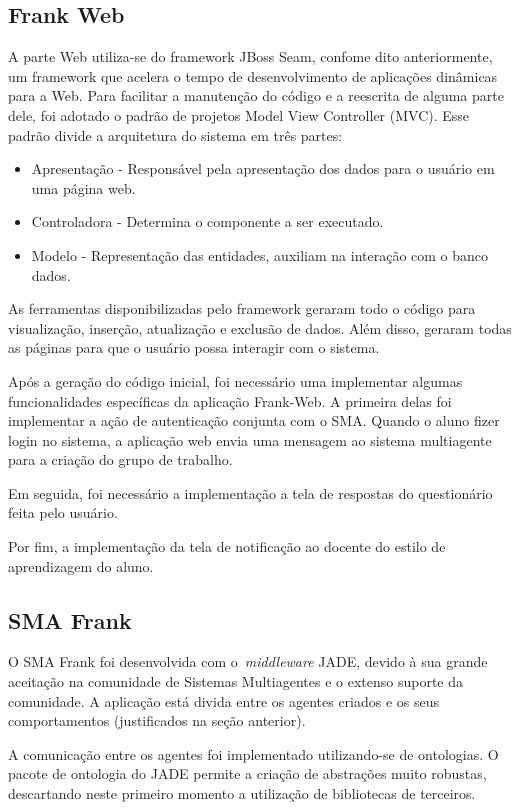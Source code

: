 \subsection{Frank Web}
A parte Web utiliza-se do framework JBoss Seam, confome dito anteriormente, um framework que acelera o tempo de desenvolvimento de aplicações dinâmicas para a Web. Para facilitar a manutenção do código e a reescrita de alguma parte dele, foi adotado o padrão de projetos
Model View Controller (MVC). Esse padrão divide a arquitetura do sistema em três partes:

\begin{itemize}
	\item Apresentação - Responsável pela apresentação dos dados para o usuário em uma página web.
	\item Controladora - Determina o componente a ser executado.
	\item Modelo - Representação das entidades, auxiliam na interação com o banco dados.
\end{itemize}

As ferramentas disponibilizadas pelo framework geraram todo o código para visualização, inserção, atualização e exclusão de dados. Além disso, geraram todas as páginas para que o usuário possa interagir com o sistema. 

Após a geração do código inicial, foi necessário uma implementar algumas funcionalidades específicas da aplicação Frank-Web. A primeira delas foi implementar a ação de autenticação conjunta com o SMA. Quando o aluno fizer login no sistema, a aplicação web envia uma mensagem ao sistema multiagente para a criação do grupo de trabalho.

Em seguida, foi necessário a implementação a tela de respostas do questionário feita pelo usuário.

Por fim, a implementação da tela de notificação ao docente do estilo de aprendizagem do aluno.

\subsection{SMA Frank}

O SMA Frank foi desenvolvida com o~\emph{middleware} JADE, devido à sua grande aceitação na comunidade de Sistemas Multiagentes e o extenso suporte da comunidade. A aplicação está divida entre os agentes criados e os seus comportamentos (justificados na seção anterior).

A comunicação entre os agentes foi implementado utilizando-se de ontologias. O pacote de ontologia do JADE permite a criação de abstrações muito robustas, descartando neste primeiro momento a utilização de bibliotecas de terceiros.

